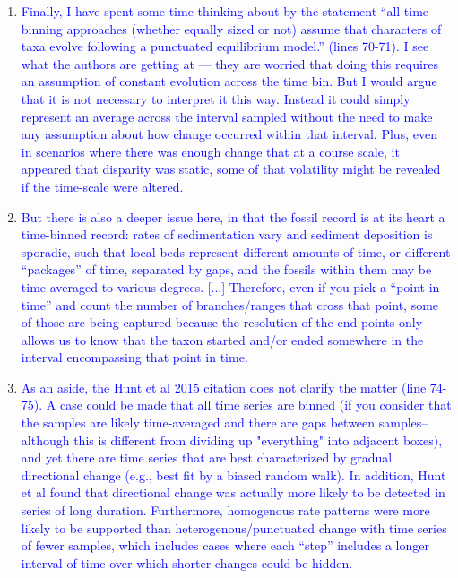 \documentclass[12pt,letterpaper]{article}
\begin{document}
\begin{enumerate}
\item{\textcolor{blue}{Finally, I have spent some time thinking about by the statement ``all time binning approaches (whether equally sized or not) assume that characters of taxa evolve following a punctuated equilibrium model.'' (lines 70-71). I see what the authors are getting at — they are worried that doing this requires an assumption of constant evolution across the time bin. But I would argue that it is not necessary to interpret it this way. Instead it could simply represent an average across the interval sampled without the need to make any assumption about how change occurred within that interval. Plus, even in scenarios where there was enough change that at a course scale, it appeared that disparity was static, some of that volatility might be revealed if the time-scale were altered.}}


\item{\textcolor{blue}{But there is also a deeper issue here, in that the fossil record is at its heart a time-binned record: rates of sedimentation vary and sediment deposition is sporadic, such that local beds represent different amounts of time, or different ``packages'' of time, separated by gaps, and the fossils within them may be time-averaged to various degrees. [...] Therefore, even if you pick a ``point in time'' and count the number of branches/ranges that cross that point, some of those are being captured because the resolution of the end points only allows us to know that the taxon started and/or ended somewhere in the interval encompassing that point in time.}}




\item{\textcolor{blue}{As an aside, the Hunt et al 2015 citation does not clarify the matter (line 74-75). A case could be made that all time series are binned (if you consider that the samples are likely time-averaged and there are gaps between samples--although this is different from dividing up "everything" into adjacent boxes), and yet there are time series that are best characterized by gradual directional change (e.g., best fit by a biased random walk). In addition, Hunt et al found that directional change was actually more likely to be detected in series of long duration. Furthermore, homogenous rate patterns were more likely to be supported than heterogenous/punctuated change with time series of fewer samples, which includes cases where each ``step'' includes a longer interval of time over which shorter changes could be hidden.}}


\end{enumerate}
\end{document}
